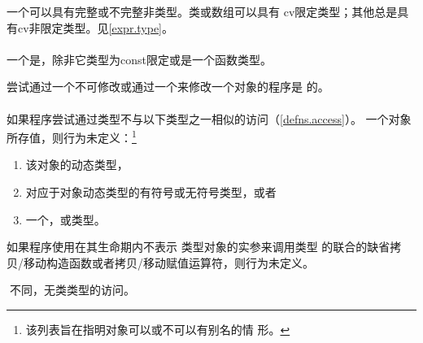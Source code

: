 \begin{note}
  一个\glvalue{}可以具有完整或不完整非类型。类或数组\prvalue{}可以具有
  cv限定类型；其他\prvalue{}总是具有cv非限定类型。见\ref{expr.type}。
\end{note}

\paragraph{} %
一个\lvalue{}是，除非它类型为const限定或是一个函数类型。

\begin{note}
  尝试通过一个不可修改\lvalue{}或通过一个\rvalue{}来修改一个对象的程序是
  \illform{}的。
\end{note}

\paragraph{} %
如果程序尝试通过类型不与以下类型之一相似的\glvalue{}访问（\ref{defns.access}）。
一个对象所存值，则行为未定义：\footnote{该列表旨在指明对象可以或不可以有别名的情
形。}
\begin{enumerate}
  \item 该对象的动态类型，
  \item 对应于对象动态类型的有符号或无符号类型，或者
  \item 一个，或类型。
\end{enumerate}
如果程序使用在其生命期内不表示 类型对象的\glvalue{}实参来调用类型
的联合的缺省拷贝/移动构造函数或者拷贝/移动赋值运算符，则行为未定义。

\begin{note}
  与\c{}不同，\cpp{}无类类型的访问。
\end{note}
